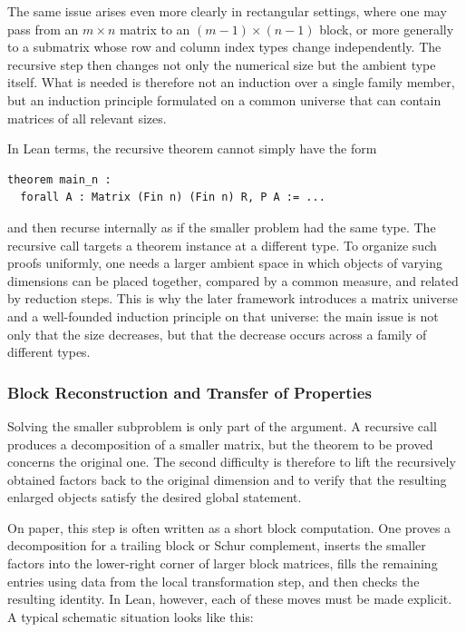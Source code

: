 \documentclass[pdflatex,sn-mathphys-num]{sn-jnl}%
\theoremstyle{thmstyleone}%
\theoremstyle{thmstyletwo}%
\theoremstyle{thmstylethree}%
\begin{document}
The same issue arises even more clearly in rectangular settings, where one may pass from an $m\times n$ matrix to an $(m-1)\times(n-1)$ block, or more generally to a submatrix whose row and column index types change independently. The recursive step then changes not only the numerical size but the ambient type itself. What is needed is therefore not an induction over a single family member, but an induction principle formulated on a common universe that can contain matrices of all relevant sizes.

In Lean terms, the recursive theorem cannot simply have the form

\begin{lstlisting}
theorem main_n :
  forall A : Matrix (Fin n) (Fin n) R, P A := ...
\end{lstlisting}

and then recurse internally as if the smaller problem had the same type. The recursive call targets a theorem instance at a different type. To organize such proofs uniformly, one needs a larger ambient space in which objects of varying dimensions can be placed together, compared by a common measure, and related by reduction steps. This is why the later framework introduces a matrix universe and a well-founded induction principle on that universe: the main issue is not only that the size decreases, but that the decrease occurs across a family of different types.

\subsubsection{Block Reconstruction and Transfer of Properties}

Solving the smaller subproblem is only part of the argument. A recursive call produces a decomposition of a smaller matrix, but the theorem to be proved concerns the original one. The second difficulty is therefore to lift the recursively obtained factors back to the original dimension and to verify that the resulting enlarged objects satisfy the desired global statement.

On paper, this step is often written as a short block computation. One proves a decomposition for a trailing block or Schur complement, inserts the smaller factors into the lower-right corner of larger block matrices, fills the remaining entries using data from the local transformation step, and then checks the resulting identity. In Lean, however, each of these moves must be made explicit. A typical schematic situation looks like this:
\end{document}
